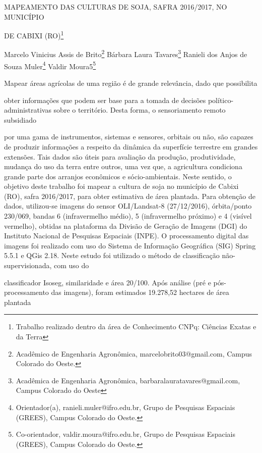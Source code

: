\documentclass[article,12pt,onesidea,4paper,english,brazil]{abntex2}
\begin{document}
	
	
	\frenchspacing 
	
	\begin{center}
		\LARGE MAPEAMENTO DAS CULTURAS DE SOJA, SAFRA 2016/2017, NO MUNICÍPIO
		
		DE CABIXI (RO)\footnote{Trabalho realizado dentro da área de Conhecimento CNPq: Ciências Exatas e da Terra}
		
		\normalsize
		Marcelo Vinicius Assis de Brito\footnote{Acadêmico de Engenharia Agronômica, marcelobrito03@gmail.com, Campus Colorado do Oeste.} 
		Bárbara Laura Tavares\footnote{Acadêmica de Engenharia Agronômica, barbaralauratavares@gmail.com, Campus Colorado do
			Oeste} 
		Ranieli dos Anjos de Souza Muler\footnote{Orientador(a), ranieli.muler@ifro.edu.br, Grupo de Pesquisas Espaciais (GREES), Campus Colorado
			do Oeste.} 
		Valdir
		Moura5\footnote{Co-orientador, valdir.moura@ifro.edu.br, Grupo de Pesquisas Espaciais (GREES), Campus
			Colorado do Oeste.} 
	\end{center}
	
	\noindent Mapear áreas agrícolas de uma região é de grande relevância, dado que possibilita
	
	obter informações que podem ser base para a tomada de decisões político-
	administrativas sobre o território. Desta forma, o sensoriamento remoto subsidiado
	
	por uma gama de instrumentos, sistemas e sensores, orbitais ou não, são capazes
	de produzir informações a respeito da dinâmica da superfície terrestre em grandes
	extensões. Tais dados são úteis para avaliação da produção, produtividade,
	mudança do uso da terra entre outros, uma vez que, a agricultura condiciona grande
	parte dos arranjos econômicos e sócio-ambientais. Neste sentido, o objetivo deste
	trabalho foi mapear a cultura de soja no município de Cabixi (RO), safra 2016/2017,
	para obter estimativa de área plantada. Para obtenção de dados, utilizou-se imagens
	do sensor OLI/Landsat-8 (27/12/2016), órbita/ponto 230/069, bandas 6
	(infravermelho médio), 5 (infravermelho próximo) e 4 (visível vermelho), obtidas na
	plataforma da Divisão de Geração de Imagens (DGI) do Instituto Nacional de
	Pesquisas Espaciais (INPE). O processamento digital das imagens foi realizado com
	uso do Sistema de Informação Geográfica (SIG) Spring 5.5.1 e QGis 2.18. Neste
	estudo foi utilizado o método de classificação não-supervisionada, com uso do
	
	classificador Isoseg, similaridade e área 20/100. Após análise (pré e pós-
	processamento das imagens), foram estimados 19.278,52 hectares de área plantada
	
\end{document}
